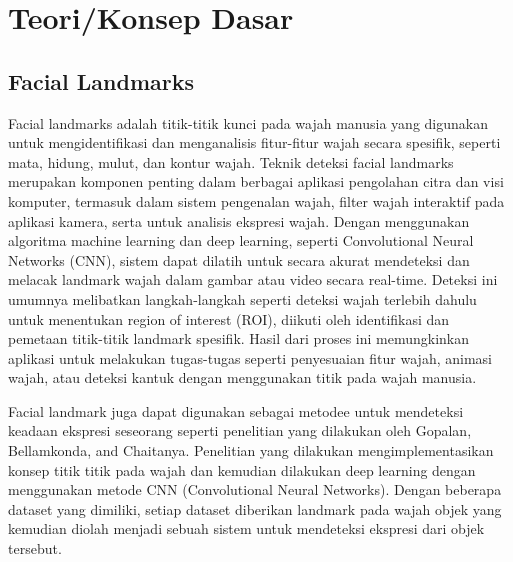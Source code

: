 \section{Teori/Konsep Dasar}
\label{sec:DasarTeori}

\subsection{Facial Landmarks}
\label{subsec:FacialLandmarks}


Facial landmarks adalah titik-titik kunci pada wajah manusia 
yang digunakan untuk mengidentifikasi dan menganalisis 
fitur-fitur wajah secara spesifik, seperti mata, hidung, 
mulut, dan kontur wajah. Teknik deteksi facial landmarks 
merupakan komponen penting dalam berbagai aplikasi pengolahan 
citra dan visi komputer, termasuk dalam sistem pengenalan wajah, 
filter wajah interaktif pada aplikasi kamera, serta untuk 
analisis ekspresi wajah. Dengan menggunakan algoritma machine 
learning dan deep learning, seperti Convolutional Neural 
Networks (CNN), sistem dapat dilatih untuk secara akurat 
mendeteksi dan melacak landmark wajah dalam gambar atau video 
secara real-time. Deteksi ini umumnya melibatkan langkah-langkah 
seperti deteksi wajah terlebih dahulu untuk menentukan region of 
interest (ROI), diikuti oleh identifikasi dan pemetaan 
titik-titik landmark spesifik\parencite{johnston2018review}. Hasil dari proses ini memungkinkan 
aplikasi untuk melakukan tugas-tugas seperti penyesuaian fitur 
wajah, animasi wajah, atau deteksi kantuk dengan menggunakan titik pada 
wajah manusia.

Facial landmark juga  dapat digunakan sebagai metodee untuk mendeteksi 
keadaan ekspresi seseorang seperti penelitian yang dilakukan oleh Gopalan,
Bellamkonda, and Chaitanya\parencite{gopalan2018facial}. Penelitian yang dilakukan mengimplementasikan 
konsep titik titik pada wajah dan kemudian dilakukan deep learning dengan menggunakan 
metode CNN (Convolutional Neural Networks). Dengan beberapa dataset yang dimiliki,
setiap dataset diberikan landmark pada wajah objek yang kemudian diolah menjadi sebuah sistem untuk 
mendeteksi ekspresi dari objek tersebut.


